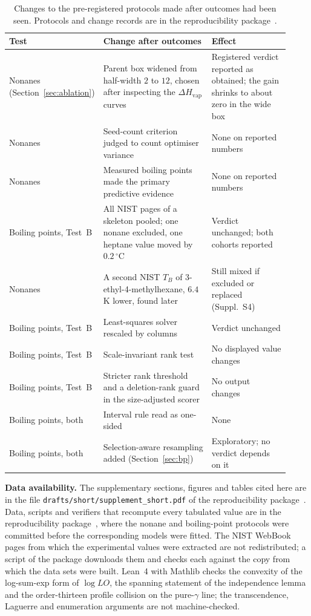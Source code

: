 \begin{table}[htbp]
\centering
\caption{Changes to the pre-registered protocols made after outcomes
had been seen. Protocols and change records are in the
reproducibility package~\cite{LoyolaRepo}.}
\label{tab:deviations}
\scriptsize
\setlength{\tabcolsep}{3pt}
\begin{tabular}{p{0.2\linewidth}p{0.42\linewidth}p{0.3\linewidth}}
\toprule
Test & Change after outcomes & Effect\\
\midrule
Nonanes (Section~\ref{sec:ablation}) & Parent box widened from half-width
$2$ to $12$, chosen after inspecting the $\Delta H_{\mathrm{vap}}$ curves &
Registered verdict reported as obtained; the gain shrinks to about
zero in the wide box\\
Nonanes & Seed-count criterion judged to count optimiser variance &
None on reported numbers\\
Nonanes & Measured boiling points made the primary predictive evidence &
None on reported numbers\\
Boiling points, Test~B & All NIST pages of a skeleton pooled; one
nonane excluded, one heptane value moved by $0.2\,^{\circ}$C &
Verdict unchanged; both cohorts reported\\
Nonanes & A second NIST $T_B$ of 3-ethyl-4-methylhexane, $6.4$\,K
lower, found later & Still mixed if excluded or replaced (Suppl.~S4)\\
Boiling points, Test~B & Least-squares solver rescaled by columns &
Verdict unchanged\\
Boiling points, Test~B & Scale-invariant rank test & No displayed value changes\\
Boiling points, Test~B & Stricter rank threshold and a deletion-rank guard in the size-adjusted scorer & No output changes\\
Boiling points, both & Interval rule read as one-sided & None\\
Boiling points, both & Selection-aware resampling added
(Section~\ref{sec:bp}) & Exploratory; no verdict depends on it\\
\bottomrule
\end{tabular}
\end{table}

\medskip
\noindent\textbf{Data availability.} The supplementary sections, figures and
tables cited here are in the file \texttt{drafts/short/supplement\_short.pdf} of
the reproducibility package~\cite{LoyolaRepo}. Data, scripts and verifiers that
recompute every tabulated value are in the reproducibility
package~\cite{LoyolaRepo}, where the nonane and boiling-point
protocols were committed before the corresponding models were fitted.
The NIST WebBook pages from which the experimental values were
extracted are not redistributed; a script of the package downloads
them and checks each against the copy from which the data sets were
built. Lean~4 with Mathlib checks the convexity of the log-sum-exp form
of $\log LO$, the spanning statement of the independence lemma and the
order-thirteen profile collision on the pure-$\gamma$ line; the
transcendence, Laguerre and enumeration arguments are not
machine-checked.


